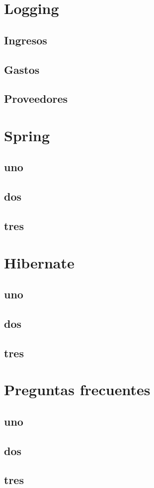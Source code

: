 \documentclass[12pt,a4paper]{article}
\begin{document}
    \section{Logging}
    \newpage
		\subsection{Ingresos}
		\newpage
		\subsection{Gastos}
		\newpage
		\subsection{Proveedores}
		\newpage

    \section{Spring}
    \newpage
		\subsection{uno}
		\newpage
		\subsection{dos}
		\newpage
		\subsection{tres}
		\newpage


    \section{Hibernate}
    \newpage
		\subsection{uno}
		\newpage
		\subsection{dos}
		\newpage
		\subsection{tres}
		\newpage

    \section{Preguntas frecuentes}
    \newpage
		\subsection{uno}
		\newpage
		\subsection{dos}
		\newpage
		\subsection{tres}
		\newpage
\end{document}
